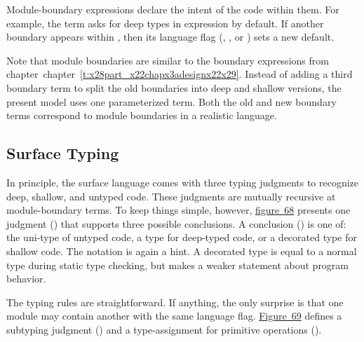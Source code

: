 \documentclass[ twoside,open=right,titlepage,numbers=noenddot,headinclude,%
                footinclude=true,cleardoublepage=empty,abstract=off,
                BCOR=5mm,paper=a4,fontsize=11pt,%
                ngerman,american,%
                parts,pdfspacing]{scrreprt}
\newcommand{\ChapRef}[2]{\SecRef{#1}{#2}}
\newcommand{\SecRef}[2]{section~#1}
\newcommand{\ChapRefLocal}[3]{\hyperref[#1]{\ChapRef{#2}{#3}}}
\newcommand{\Ssubsubsection}[2]{\subsubsection[#1]{#2}}
\newcommand{\FigureRef}[2]{#1}
\renewcommand{\Ssubsubsection}[2]{\subsection[#1]{#2}}
\renewcommand{\ChapRefLocal}[3]{chapter~\ref{#1}}
\begin{document}
Module{-}boundary expressions declare the intent of the code within them.
For example, the term  asks for deep types
 in expression  by default.
If another boundary appears within , then its language flag
 (\relax{$\sD$}, \relax{$\sS$}, or \relax{$\sU$}) sets a new default.

Note that module boundaries are similar to the boundary expressions
 from chapter~\ChapRefLocal{t:x28part_x22chapx3adesignx22x29}{4}{Design Analysis Method}.
Instead of adding a third boundary term to split the old \relax{$\sstat$} boundaries
 into deep and shallow versions, the present model uses one
 parameterized term.
Both the old and new boundary terms correspond to module boundaries in a
 realistic language.

\Ssubsubsection{Surface Typing}{Surface Typing}\label{t:x28part_x22secx3abothx3amodelx3atypesx22x29}

In principle, the surface language comes with three typing judgments
 to recognize deep, shallow, and untyped code.
These judgments are mutually recursive at module{-}boundary terms.
To keep things simple, however, \hyperref[t:x28counter_x28x22figurex22_x22figx3abothx3asurfacex2dtypex22x29x29]{figure~\FigureRef{68}{t:x28counter_x28x22figurex22_x22figx3abothx3asurfacex2dtypex22x29x29}}
 presents one judgment (\relax{$\stypeenv \sST \sexpr : \stspec$})
 that supports three possible conclusions.
A conclusion (\relax{$\stspec$}) is one of:
 the uni{-}type \relax{$\tdyn$} of untyped code,
 a type \relax{$\stype$} for deep{-}typed code,
 or a decorated type \relax{$\tfloor{\stype}$} for shallow code.
The notation is again a hint.
A decorated type is equal to a normal type during static type checking,
 but makes a weaker statement about program behavior.

The typing rules are straightforward.
If anything, the only surprise is that one module may contain another with
 the same language flag.
\hyperref[t:x28counter_x28x22figurex22_x22figx3abothx3aextrax2dtypex22x29x29]{Figure~\FigureRef{69}{t:x28counter_x28x22figurex22_x22figx3abothx3aextrax2dtypex22x29x29}} defines a
 subtyping judgment (\relax{$\ssubt$}) and a type{-}assignment for primitive
 operations (\relax{$\sDelta$}).
\end{document}
